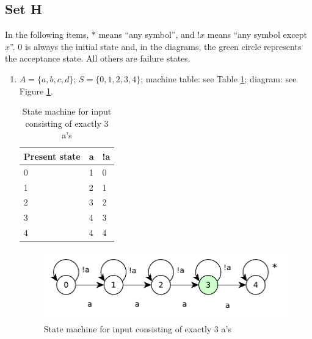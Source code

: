 \documentclass{article}
\begin{document}
\subsection{Set H}
In the following items, $*$ means ``any symbol'', and $!x$ means ``any symbol except $x$''. $0$ is always the initial state and, in the diagrams, the green circle represents the acceptance state. All others are failure states.
\begin{enumerate}
    \item $A = \{a, b, c, d\}$; $S = \{0, 1, 2, 3, 4\}$; machine table: see Table \ref{tab:machine-3as}; diagram: see Figure \ref{fig:threeas}.
    \begin{table}[!ht]
        \centering
        \begin{tabular}{l|ll}
        Present state & a & !a \\ \hline
        0             & 1 & 0  \\
        1             & 2 & 1  \\
        2             & 3 & 2  \\
        3             & 4 & 3  \\
        4             & 4 & 4 
        \end{tabular}
        \caption{State machine for input consisting of exactly 3 a's}
        \label{tab:machine-3as}
    \end{table}
    \begin{figure}[!ht]
        \centering
        \includegraphics[scale=0.5]{diagrams/threeas.pdf}
        \caption{State machine for input consisting of exactly 3 a's}
        \label{fig:threeas}
    \end{figure}
    

\end{enumerate}
\end{document}
